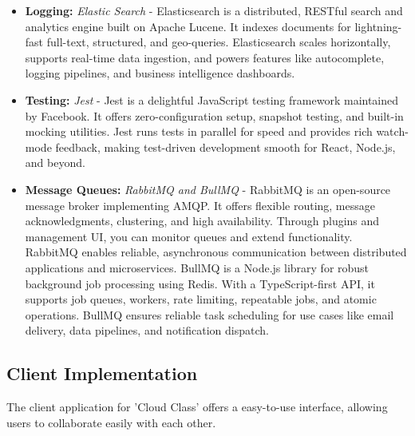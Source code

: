 \begin{itemize}
    \item \textbf{Logging:} \textit{Elastic Search} - Elasticsearch is a distributed, RESTful search and analytics engine built on Apache Lucene. It indexes documents for lightning-fast full-text, structured, and geo-queries. Elasticsearch scales horizontally, supports real-time data ingestion, and powers features like autocomplete, logging pipelines, and business intelligence dashboards.
    \item \textbf{Testing:} \textit{Jest} - Jest is a delightful JavaScript testing framework maintained by Facebook. It offers zero-configuration setup, snapshot testing, and built-in mocking utilities. Jest runs tests in parallel for speed and provides rich watch-mode feedback, making test-driven development smooth for React, Node.js, and beyond.
    \item \textbf{Message Queues:} \textit{RabbitMQ and BullMQ} - RabbitMQ is an open-source message broker implementing AMQP. It offers flexible routing, message acknowledgments, clustering, and high availability. Through plugins and management UI, you can monitor queues and extend functionality. RabbitMQ enables reliable, asynchronous communication between distributed applications and microservices. BullMQ is a Node.js library for robust background job processing using Redis. With a TypeScript-first API, it supports job queues, workers, rate limiting, repeatable jobs, and atomic operations. BullMQ ensures reliable task scheduling for use cases like email delivery, data pipelines, and notification dispatch.
\end{itemize}

\subsection{Client Implementation}
The client application for 'Cloud Class' offers a easy-to-use interface, allowing users to collaborate easily with each other. 


